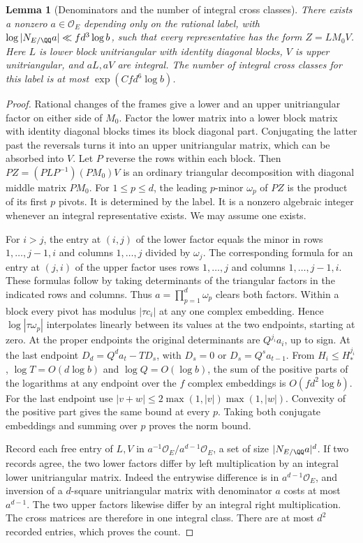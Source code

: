 \documentclass[a4paper,11pt]{article}
\newtheorem{lemma}[proposition]{Lemma}
\theoremstyle{definition}
\theoremstyle{remark}
\numberwithin{equation}{section}
\newcommand{\OO}{\mathcal O}
\begin{document}
\begin{lemma}[Denominators and the number of integral cross classes]\leavevmode
\label{lem:classes304}
There exists a nonzero \(a\in\OO_E\) depending only on the
rational label, with
\(\log |N_{E/\QQ}a|\ll fd^3\log b\), such that every
representative has the form \(Z=L M_0 V\). Here \(L\) is
lower block unitriangular with identity diagonal blocks,
\(V\) is upper unitriangular, and \(aL,aV\) are integral.
The number of integral cross classes for this label is at
most \(\exp(Cfd^6\log b)\).
\end{lemma}
\begin{proof}
Rational changes of the frames give a lower and an upper
unitriangular factor on either side of \(M_0\). Factor
the lower matrix into a lower block matrix with identity
diagonal blocks times its block diagonal part. Conjugating
the latter past the reversals turns it into an upper
unitriangular matrix, which can be absorbed into \(V\).
Let \(P\) reverse the rows within each block. Then
\(P Z=(P L P^{-1})(P M_0)V\) is an ordinary triangular
decomposition with diagonal middle matrix \(P M_0\).
For \(1\le p\le d\), the leading \(p\)-minor \(\omega_p\)
of \(P Z\) is the product of its first \(p\) pivots. It
is determined by the label. It is a nonzero algebraic
integer whenever an integral representative exists. We
may assume one exists.

For \(i>j\), the entry at \((i,j)\) of the lower factor
equals the minor in rows \(1,\ldots,j-1,i\) and columns
\(1,\ldots,j\) divided by \(\omega_j\). The corresponding
formula for an entry at \((j,i)\) of the upper factor
uses rows \(1,\ldots,j\) and columns \(1,\ldots,j-1,i\).
These formulas follow by taking determinants of the
triangular factors in the indicated rows and columns.
Thus \(a=\prod_{p=1}^d\omega_p\) clears both factors.
Within a block every pivot has modulus \(|\tau c_i|\)
at any one complex embedding. Hence \(\log|\tau\omega_p|\)
interpolates linearly between its values at the two
endpoints, starting at zero. At the proper endpoints
the original determinants are \(Q^{j_i}a_i\), up to sign.
At the last endpoint \(D_d=Q^d a_t-TD_s\), with \(D_s=0\)
or \(D_s=Q^s a_{t-1}\). From \(H_i\le H_*^{j_i}\),
\(\log T=O(d\log b)\) and \(\log Q=O(\log b)\), the sum
of the positive parts of the logarithms at any endpoint
over the \(f\) complex embeddings is \(O(fd^2\log b)\).
For the last endpoint use \(|v+w|\le
2\max(1,|v|)\max(1,|w|)\). Convexity of the positive part
gives the same bound at every \(p\). Taking both conjugate
embeddings and summing over \(p\) proves the norm bound.

Record each free entry of \(L,V\) in
\(a^{-1}\OO_E/a^{d-1}\OO_E\), a set of size \(|N_{E/\QQ}a|^d\).
If two records agree, the two lower factors differ by
left multiplication by an integral lower unitriangular
matrix. Indeed the entrywise difference is in
\(a^{d-1}\OO_E\), and inversion of a \(d\)-square
unitriangular matrix with denominator \(a\) costs at
most \(a^{d-1}\). The two upper factors likewise differ
by an integral right multiplication. The cross matrices
are therefore in one integral class. There are at most
\(d^2\) recorded entries, which proves the count.
\end{proof}
\end{document}
